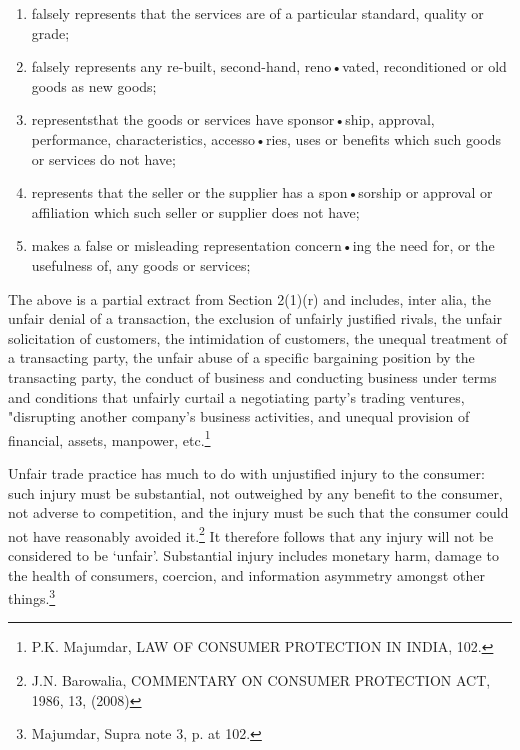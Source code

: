 \begin{multicols}{2}
{\begin{enumerate}[label=(\roman*)]
\item falsely represents that the services are of a particular standard, quality or grade;

\item falsely represents any re-built, second-hand, reno•vated, reconditioned or old goods as new goods;

\item representsthat the goods or services have sponsor•ship, approval, performance, characteristics,
accesso•ries, uses or benefits which such goods or services do not have;

\item represents that the seller or the supplier has a spon•sorship or approval or affiliation which such seller or
supplier does not have;

\item makes a false or misleading representation concern•ing the need for, or the usefulness of, any goods or services;
\end{enumerate}}


\noi
The above is a partial extract from Section 2(1)(r) and includes, inter alia, the unfair denial of
a transaction, the exclusion of unfairly justified rivals, the unfair solicitation of customers, the
intimidation of customers, the unequal treatment of a transacting party, the unfair abuse of a
specific bargaining position by the transacting party, the conduct of business and conducting
business under terms and conditions that unfairly curtail a negotiating party's trading ventures, "disrupting another company's business activities, and unequal provision of financial, assets,
manpower, etc.\footnote{P.K. Majumdar, LAW OF CONSUMER PROTECTION IN INDIA, 102.}


\noi
Unfair trade practice has much to do with unjustified injury to the consumer: such injury must
be substantial, not outweighed by any benefit to the consumer, not adverse to competition, and
the injury must be such that the consumer could not have reasonably avoided it.\footnote{J.N. Barowalia, COMMENTARY ON CONSUMER PROTECTION ACT, 1986, 13, (2008)} It therefore follows that any injury will not be considered to be ‘unfair’. Substantial injury includes monetary harm, damage to the health of consumers, coercion, and information asymmetry amongst other things.\footnote{Majumdar, Supra note 3, p. at 102.}


\end{multicols}

